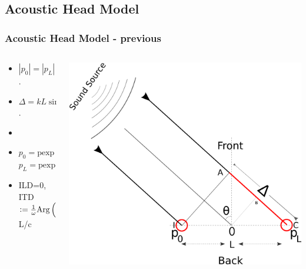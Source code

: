 \documentclass{beamer}
\begin{document}
\subsection{Acoustic Head Model}
\begin{frame}[t]
 \frametitle{Acoustic Head Model - previous}
 \begin{columns}
     \begin{column}{.5\textwidth}
    \small
    \flushleft
     \hspace{2pt}
     
     \begin{itemize}
      \item<2> $|p_0|=|p_L|$.
      \item<2> $\Delta=kL\sin\theta$.
      \item[]
       \item<3>[$\bullet$] $p_0=\mbox{p}\mathrm{ exp}\left(- j\Delta/2\right)$\\ $p_L=\mbox{p}\mathrm{ exp}\left(j\Delta/2\right)$
      \item<3>[$\bullet$] ILD=0, ITD$\vcentcolon=\frac{1}{\omega}\mbox{Arg}\left(\frac{p^0}{p^L}\right)=$L/c
      \end{itemize}

    \end{column}
    
    
 \begin{column}{0.5\textwidth}
    \includegraphics[width = 6 cm]{Diagrams/Presentation/acousticheadmodelold.png}\\
    \end{column}

    \end{columns}
\end{frame}
\end{document}
